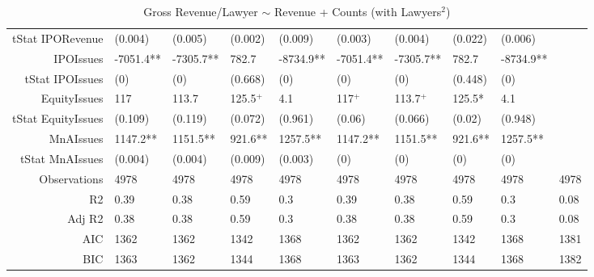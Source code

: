 \begin{table}[ht]
\begin{tabular}{rlllllllll}
  tStat IPORevenue & (0.004) & (0.005) & (0.002) & (0.009) & (0.003) & (0.004) & (0.022) & (0.006) &  \\ 
  IPOIssues & -7051.4** & -7305.7** & 782.7 & -8734.9** & -7051.4** & -7305.7** & 782.7 & -8734.9** &  \\ 
  tStat IPOIssues & (0) & (0) & (0.668) & (0) & (0) & (0) & (0.448) & (0) &  \\ 
  EquityIssues & 117 & 113.7 & 125.5$^{+}$ & 4.1 & 117$^{+}$ & 113.7$^{+}$ & 125.5* & 4.1 &  \\ 
  tStat EquityIssues & (0.109) & (0.119) & (0.072) & (0.961) & (0.06) & (0.066) & (0.02) & (0.948) &  \\ 
  MnAIssues & 1147.2** & 1151.5** & 921.6** & 1257.5** & 1147.2** & 1151.5** & 921.6** & 1257.5** &  \\ 
  tStat MnAIssues & (0.004) & (0.004) & (0.009) & (0.003) & (0) & (0) & (0) & (0) &  \\ 
  Observations & 4978 & 4978 & 4978 & 4978 & 4978 & 4978 & 4978 & 4978 & 4978 \\ 
  R2 & 0.39 & 0.38 & 0.59 & 0.3 & 0.39 & 0.38 & 0.59 & 0.3 & 0.08 \\ 
  Adj R2 & 0.38 & 0.38 & 0.59 & 0.3 & 0.38 & 0.38 & 0.59 & 0.3 & 0.08 \\ 
  AIC & 1362 & 1362 & 1342 & 1368 & 1362 & 1362 & 1342 & 1368 & 1381 \\ 
  BIC & 1363 & 1362 & 1344 & 1368 & 1363 & 1362 & 1344 & 1368 & 1382 \\ 
   \hline
\end{tabular}
\caption{Gross Revenue/Lawyer $\sim$ Revenue + Counts (with Lawyers$^2$)} 
\end{table}
